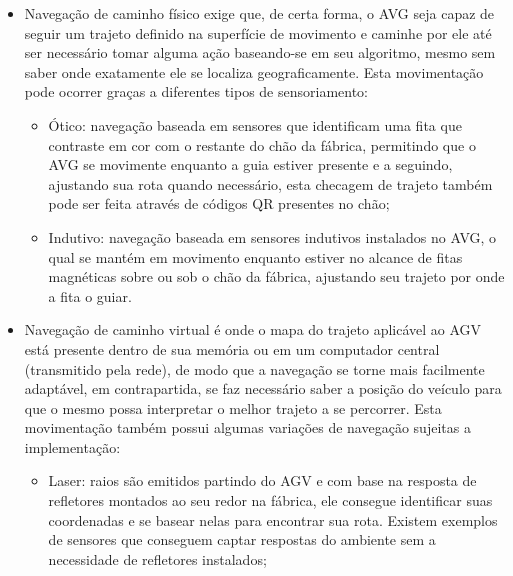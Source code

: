 \begin{itemize}

        \item Navegação de caminho físico exige que, de certa forma, o AVG seja
                capaz de seguir um trajeto definido na superfície de movimento
                e caminhe por ele até ser necessário tomar alguma ação
                baseando-se em seu algoritmo, mesmo sem saber onde exatamente
                ele se localiza geograficamente. Esta movimentação pode ocorrer
                graças a diferentes tipos de sensoriamento:

        \begin{itemize}
                \item Ótico: navegação baseada em sensores que identificam uma
                        fita que contraste em cor com o restante do chão da
                        fábrica, permitindo que o AVG se movimente enquanto a
                        guia estiver presente e a seguindo, ajustando sua rota
                        quando necessário, esta checagem de trajeto também pode
                        ser feita através de códigos QR presentes no chão;

                \item Indutivo: navegação baseada em sensores indutivos
                        instalados no AVG, o qual se mantém em movimento enquanto
                        estiver no alcance de fitas magnéticas sobre ou sob o
                        chão da fábrica, ajustando seu trajeto por onde a fita
                        o guiar.

        \end{itemize}

        \item Navegação de caminho virtual é onde o mapa do trajeto aplicável
                ao AGV está presente dentro de sua memória ou em um computador
                central (transmitido pela rede), de modo que a navegação se
                torne mais facilmente adaptável, em contrapartida, se faz
                necessário saber a posição do veículo para que o mesmo possa
                interpretar o melhor trajeto a se percorrer. Esta movimentação
                também possui algumas variações de navegação sujeitas a
                implementação:

        \begin{itemize}

                \item Laser: raios são emitidos partindo do AGV e com base na
                        resposta de refletores montados ao seu redor na
                        fábrica, ele consegue identificar suas coordenadas e se
                        basear nelas para encontrar sua rota. Existem exemplos
                        de sensores que conseguem captar respostas do ambiente
                        sem a necessidade de refletores instalados;


\end{itemize}
\end{itemize}
